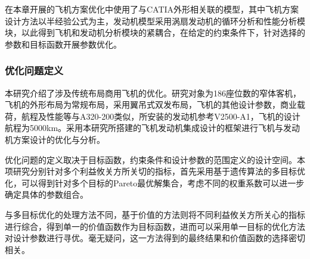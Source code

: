 \documentclass[12pt,a4paper]{report}
\begin{document}
在本章开展的飞机方案优化中使用了与CATIA外形相关联的模型，其中飞机方案设计方法以半经验公式为主，发动机模型采用涡扇发动机的循环分析和性能分析模块，以此得到飞机和发动机分析模块的紧耦合，在给定的约束条件下，针对选择的参数和目标函数开展参数优化。


\subsubsection{优化问题定义}
本研究介绍了涉及传统布局商用飞机的优化。研究对象为186座位数的窄体客机，飞机的外形布局为常规布局，采用翼吊式双发布局，飞机的其他设计参数，商业载荷，航程及性能等与A320-200类似，所安装的发动机参考V2500-A1，飞机的设计航程为5000km。采用本研究所搭建的飞机发动机集成设计的框架进行飞机与发动机方案设计的优化与分析。

优化问题的定义取决于目标函数，约束条件和设计参数的范围定义的设计空间。本项研究分别针对多个利益攸关方所关切的指标，首先采用基于遗传算法的多目标优化，可以得到针对多个目标的Pareto最优解集合，考虑不同的权重系数可以进一步确定具体的参数组合。

与多目标优化的处理方法不同，基于价值的方法则将不同利益攸关方所关心的指标进行综合，得到单一的价值函数作为目标函数，进而可以采用单一目标的优化方法对设计参数进行寻优。毫无疑问，这一方法得到的最终结果和价值函数的选择密切相关。
\end{document}
